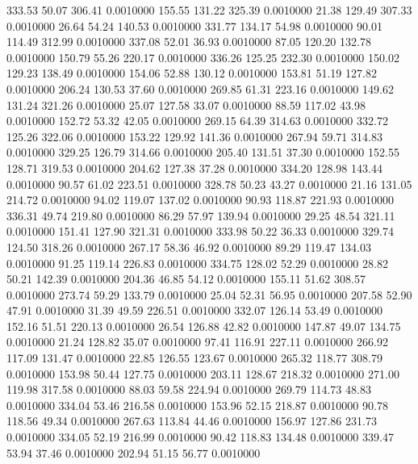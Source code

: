  333.53   50.07  306.41   0.0010000
 155.55  131.22  325.39   0.0010000
  21.38  129.49  307.33   0.0010000
  26.64   54.24  140.53   0.0010000
 331.77  134.17   54.98   0.0010000
  90.01  114.49  312.99   0.0010000
 337.08   52.01   36.93   0.0010000
  87.05  120.20  132.78   0.0010000
 150.79   55.26  220.17   0.0010000
 336.26  125.25  232.30   0.0010000
 150.02  129.23  138.49   0.0010000
 154.06   52.88  130.12   0.0010000
 153.81   51.19  127.82   0.0010000
 206.24  130.53   37.60   0.0010000
 269.85   61.31  223.16   0.0010000
 149.62  131.24  321.26   0.0010000
  25.07  127.58   33.07   0.0010000
  88.59  117.02   43.98   0.0010000
 152.72   53.32   42.05   0.0010000
 269.15   64.39  314.63   0.0010000
 332.72  125.26  322.06   0.0010000
 153.22  129.92  141.36   0.0010000
 267.94   59.71  314.83   0.0010000
 329.25  126.79  314.66   0.0010000
 205.40  131.51   37.30   0.0010000
 152.55  128.71  319.53   0.0010000
 204.62  127.38   37.28   0.0010000
 334.20  128.98  143.44   0.0010000
  90.57   61.02  223.51   0.0010000
 328.78   50.23   43.27   0.0010000
  21.16  131.05  214.72   0.0010000
  94.02  119.07  137.02   0.0010000
  90.93  118.87  221.93   0.0010000
 336.31   49.74  219.80   0.0010000
  86.29   57.97  139.94   0.0010000
  29.25   48.54  321.11   0.0010000
 151.41  127.90  321.31   0.0010000
 333.98   50.22   36.33   0.0010000
 329.74  124.50  318.26   0.0010000
 267.17   58.36   46.92   0.0010000
  89.29  119.47  134.03   0.0010000
  91.25  119.14  226.83   0.0010000
 334.75  128.02   52.29   0.0010000
  28.82   50.21  142.39   0.0010000
 204.36   46.85   54.12   0.0010000
 155.11   51.62  308.57   0.0010000
 273.74   59.29  133.79   0.0010000
  25.04   52.31   56.95   0.0010000
 207.58   52.90   47.91   0.0010000
  31.39   49.59  226.51   0.0010000
 332.07  126.14   53.49   0.0010000
 152.16   51.51  220.13   0.0010000
  26.54  126.88   42.82   0.0010000
 147.87   49.07  134.75   0.0010000
  21.24  128.82   35.07   0.0010000
  97.41  116.91  227.11   0.0010000
 266.92  117.09  131.47   0.0010000
  22.85  126.55  123.67   0.0010000
 265.32  118.77  308.79   0.0010000
 153.98   50.44  127.75   0.0010000
 203.11  128.67  218.32   0.0010000
 271.00  119.98  317.58   0.0010000
  88.03   59.58  224.94   0.0010000
 269.79  114.73   48.83   0.0010000
 334.04   53.46  216.58   0.0010000
 153.96   52.15  218.87   0.0010000
  90.78  118.56   49.34   0.0010000
 267.63  113.84   44.46   0.0010000
 156.97  127.86  231.73   0.0010000
 334.05   52.19  216.99   0.0010000
  90.42  118.83  134.48   0.0010000
 339.47   53.94   37.46   0.0010000
 202.94   51.15   56.77   0.0010000
